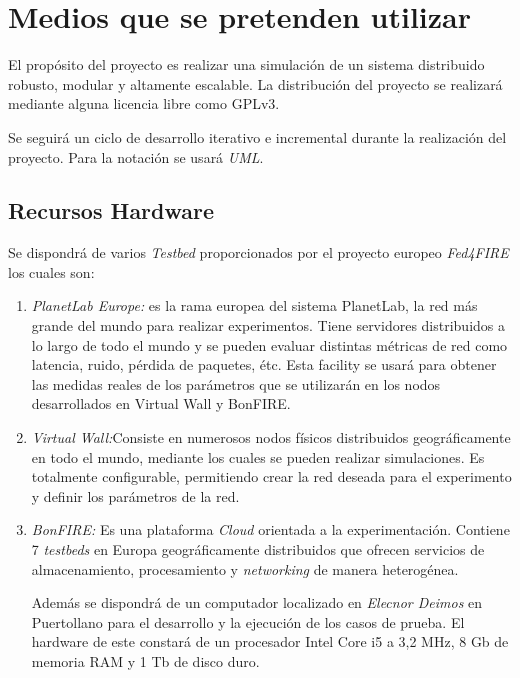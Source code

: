 
\section{Medios que se pretenden utilizar}
\label{sec:medios}

El propósito del proyecto es realizar una simulación de un sistema distribuido robusto, modular y altamente escalable.
La distribución del proyecto se realizará mediante alguna licencia libre como GPLv3\cite{GPLv3}.

Se seguirá un ciclo de desarrollo iterativo e incremental durante la realización del proyecto.
Para la notación se usará \emph{UML}\cite{UML}.

\subsection{Recursos Hardware}
\label{sec:hardware}
Se dispondrá de varios \emph{Testbed} proporcionados por el proyecto europeo \emph{Fed4FIRE} los cuales son:
\begin{enumerate}
\item \emph{PlanetLab Europe\cite{PLE}:} es la rama europea del sistema PlanetLab, la red más grande del mundo para realizar experimentos. Tiene servidores distribuidos a lo largo de todo el mundo y se pueden evaluar distintas métricas de red como latencia, ruido, pérdida de paquetes, étc. Esta facility se usará para obtener las medidas reales de los parámetros que se utilizarán en los nodos desarrollados en Virtual Wall y BonFIRE.

\item \emph{Virtual Wall\cite{VW}:}Consiste en numerosos nodos físicos distribuidos geográficamente en todo el mundo, mediante los cuales se pueden realizar simulaciones. Es totalmente configurable, permitiendo crear la red deseada para el experimento y definir los parámetros de la red.
\item \emph{BonFIRE\cite{BF}:} Es una plataforma \emph{Cloud} orientada a la experimentación. Contiene 7 \emph{testbeds} en Europa geográficamente distribuidos que ofrecen servicios de almacenamiento, procesamiento y \emph{networking} de manera heterogénea.

Además se dispondrá de un computador localizado en \emph{Elecnor Deimos} en Puertollano para el desarrollo y la ejecución de los casos de prueba. El hardware de este constará de un procesador Intel Core i5 a 3,2 MHz, 8 Gb de memoria RAM y 1 Tb de disco duro.

\end{enumerate}

